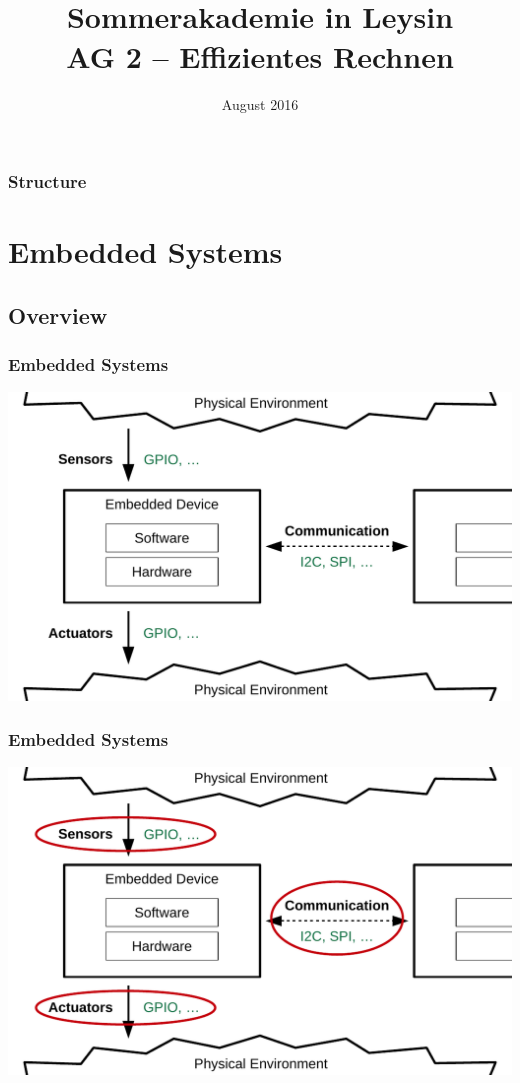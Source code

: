 \documentclass{beamer}
\title[\doctitle]{
	\Large \doctitle \\
	[5mm] \normalsize Sommerakademie in Leysin \\
	AG 2 -- Effizientes Rechnen
}
\author[\docauthor]{\docauthor}
\institute[]{
	Universität des Saarlandes\\[3mm]
}
\date{August 2016}
\begin{document}
\begin{frame}
	\titlepage
\end{frame}

\begin{frame}
  \frametitle{Structure}
  \tableofcontents
\end{frame}

\section{Embedded Systems}
\subsection{Overview}

\AtBeginSection[]{
  \begin{frame}
  \tableofcontents[currentsection]
  \end{frame}
}

\begin{frame}
  \frametitle{Embedded Systems}
  \includegraphics[width=\textwidth]{images/overview.pdf}
\end{frame}

\begin{frame}
  \frametitle{Embedded Systems}
  \includegraphics[width=\textwidth]{images/overview-focus.pdf}
\end{frame}
\end{document}
